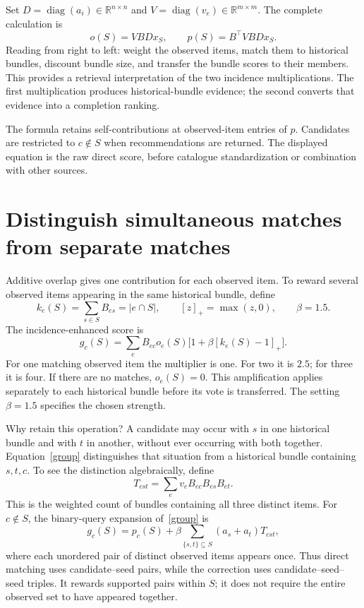 \documentclass[11pt,a4paper]{article}
\newcommand{\diag}{\operatorname{diag}}
\begin{document}
Set $D=\diag(a_i)\in\mathbb R^{n\times n}$ and
$V=\diag(v_e)\in\mathbb R^{m\times m}$. The complete calculation is
\begin{equation}
 o(S)=VBDx_S,\qquad \boxed{p(S)=B^\top VBDx_S.}
\end{equation}
Reading from right to left: weight the observed items, match them to historical
bundles, discount bundle size, and transfer the bundle scores to their members.
This provides a retrieval interpretation of the two incidence multiplications.
The first multiplication produces historical-bundle evidence; the second
converts that evidence into a completion ranking.

The formula retains self-contributions at observed-item entries of $p$.
Candidates are restricted to $c\notin S$ when recommendations are returned.
The displayed equation is the raw direct score, before catalogue standardization
or combination with other sources.

\section{Distinguish simultaneous matches from separate matches}
Additive overlap gives one contribution for each observed item. To reward several
observed items appearing in the same historical bundle, define
\[
 k_e(S)=\sum_{s\in S}B_{es}=|e\cap S|,\qquad [z]_+=\max(z,0),
 \qquad\beta=1.5.
\]
The incidence-enhanced score is
\begin{equation}\label{group}
 \boxed{g_c(S)=\sum_eB_{ec}o_e(S)
                   \bigl[1+\beta[k_e(S)-1]_+\bigr].}
\end{equation}
For one matching observed item the multiplier is one. For two it is $2.5$;
for three it is four. If there are no matches, $o_e(S)=0$.
This amplification applies separately to each historical bundle before its
vote is transferred. The setting $\beta=1.5$ specifies the chosen strength.

Why retain this operation? A candidate may occur with $s$ in one historical
bundle and with $t$ in another, without ever occurring with both together.
Equation~\eqref{group} distinguishes that situation from a historical bundle
containing $s,t,c$. To see the distinction algebraically, define
\[
 T_{cst}=\sum_e v_eB_{ec}B_{es}B_{et}.
\]
This is the weighted count of bundles containing all three distinct items.
For $c\notin S$, the binary-query expansion of~\eqref{group} is
\begin{equation}
 g_c(S)=p_c(S)+\beta\sum_{\{s,t\}\subseteq S}(a_s+a_t)T_{cst},
\end{equation}
where each unordered pair of distinct observed items appears once.
Thus direct matching uses candidate--seed pairs, while the correction uses
candidate--seed--seed triples. It rewards supported pairs within $S$; it does
not require the entire observed set to have appeared together.
\end{document}
